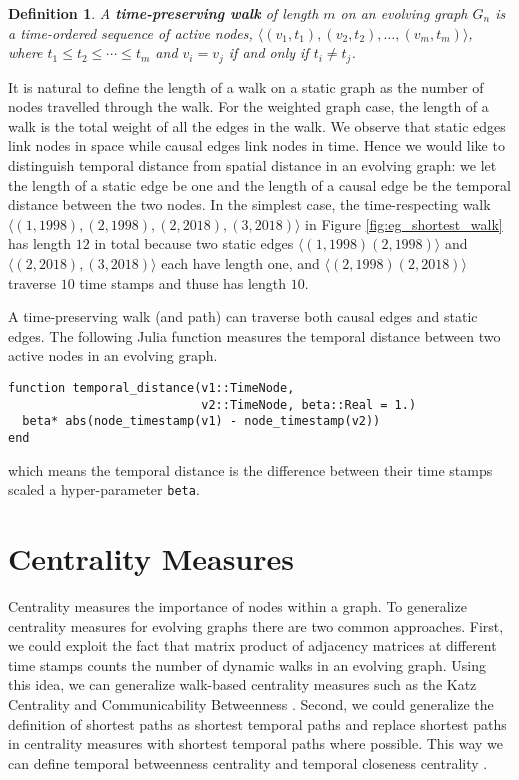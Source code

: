 \documentclass[12pt]{article}
\newtheorem{definition}{Definition}
\theoremstyle{definition}
\begin{document}
\begin{definition}
A \textbf{time-preserving walk}  of length $m$ on an evolving graph $G_n$ is a time-ordered sequence of active nodes, $\langle (v_1, t_1), (v_2, t_2), \ldots, (v_m, t_m) \rangle$, where $t_1 \le t_2 \le \cdots \le t_m$ and
$v_i = v_j$ if and only if $t_i \ne t_j$.
\end{definition}

It is natural to define the length of a walk on a static graph as the number of nodes travelled through the walk. For the weighted graph case, the length of a walk is the total weight of all the edges in the walk. We observe that static edges link nodes in space while causal edges link nodes in time. Hence we would like to distinguish temporal distance from spatial distance in an evolving graph: we let the length of a static edge be one and the length of a causal edge be the temporal distance between the two nodes. In the simplest case, the time-respecting walk
$\langle (1, 1998) ,(2, 1998) , (2, 2018), (3, 2018)\rangle$ in Figure \ref{fig:eg_shortest_walk} has length $12$ in total because two static edges $\langle (1, 1998) (2, 1998) \rangle$ and $\langle (2, 2018), (3, 2018) \rangle$ each have length one, and $\langle (2, 1998) (2, 2018) \rangle$
traverse $10$ time stamps and thuse has length $10$.

A time-preserving walk (and path) can traverse both causal edges and static edges.
The following Julia function measures the temporal distance between two active nodes in an evolving graph.

\begin{lstlisting}
function temporal_distance(v1::TimeNode,
                           v2::TimeNode, beta::Real = 1.)
  beta* abs(node_timestamp(v1) - node_timestamp(v2))
end
\end{lstlisting}
which means the temporal distance is the difference between their time stamps scaled a hyper-parameter
\texttt{beta}.

\section{Centrality Measures}
\label{sec:topol-temp-flow}

Centrality measures the importance of nodes within a graph.
To generalize centrality measures for evolving graphs there are two common approaches.
First, we could exploit the fact that matrix product of adjacency matrices at different time stamps counts the number of dynamic walks in an evolving graph. Using this idea, we can generalize walk-based centrality measures such as
the Katz Centrality \cite{estrada09} and Communicability Betweenness \cite{alsayed15}.
Second, we could generalize the definition of shortest paths as shortest temporal paths and replace shortest paths in centrality measures with shortest temporal paths where possible. This way we can define temporal betweenness centrality and temporal closeness centrality \cite{nicosia13}.
\end{document}
